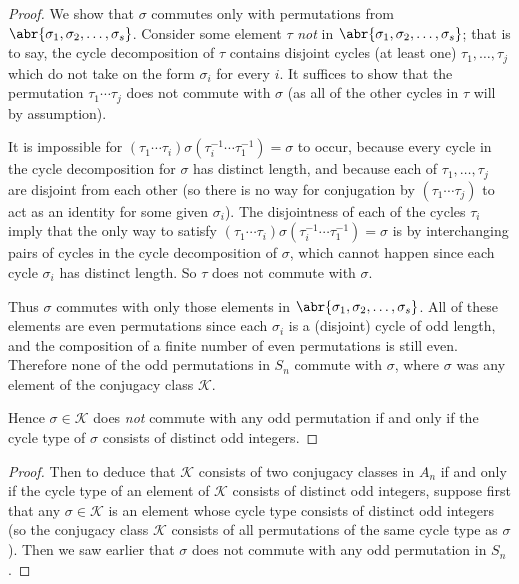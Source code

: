\documentclass[11pt]{article}
\begin{document}
\begin{enumerate}
\begin{proof}
      We show that $\sigma$ commutes only with permutations from $\abr{\sigma_1, \sigma_2, \dots ,\sigma_s}$. Consider some element $\tau$ \textit{not} in $\abr{\sigma_1, \sigma_2, \dots ,\sigma_s}$; that is to say, the cycle decomposition of $\tau$ contains disjoint cycles (at least one) $\tau_1,\dots,\tau_j$ which do not take on the form $\sigma_i$ for every $i$. It suffices to show that the permutation $\tau_1\cdots \tau_j$ does not commute with $\sigma$ (as all of the other cycles in $\tau$ will by assumption).

      It is impossible for $(\tau_1\cdots\tau_i)\sigma(\tau_i^{-1}\cdots\tau_1^{-1}) = \sigma$ to occur, because every cycle in the cycle decomposition for $\sigma$ has distinct length, and because each of $\tau_1,\dots,\tau_j$ are disjoint from each other (so there is no way for conjugation by $(\tau_1\cdots\tau_j)$ to act as an identity for some given $\sigma_i$). The disjointness of each of the cycles $\tau_i$ imply that the only way to satisfy $(\tau_1\cdots\tau_i)\sigma(\tau_i^{-1}\cdots\tau_1^{-1}) = \sigma$ is by interchanging pairs of cycles in the cycle decomposition of $\sigma$, which cannot happen since each cycle $\sigma_i$ has distinct length. So $\tau$ does not commute with $\sigma$.

      Thus $\sigma$ commutes with only those elements in $\abr{\sigma_1, \sigma_2, \dots ,\sigma_s}$. All of these elements are even permutations since each $\sigma_i$ is a (disjoint) cycle of odd length, and the composition of a finite number of even permutations is still even. Therefore none of the odd permutations in $S_n$ commute with $\sigma$, where $\sigma$ was any element of the conjugacy class $\mathcal{K}$.

      Hence $\sigma\in \mathcal{K}$ does \textit{not} commute with any odd permutation if and only if the cycle type of $\sigma$ consists of distinct odd integers.
    \end{proof}
    \begin{proof}
      Then to deduce that $\mathcal{K}$ consists of two conjugacy classes in $A_n$ if and only if the cycle type of an element of $\mathcal{K}$ consists of distinct odd integers, suppose first that any $\sigma\in \mathcal{K}$ is an element whose cycle type consists of distinct odd integers (so the conjugacy class $\mathcal{K}$ consists of all permutations of the same cycle type as $\sigma$). Then we saw earlier that $\sigma$ does not commute with any odd permutation in $S_n$.


\end{proof}
\end{enumerate}
\end{document}
